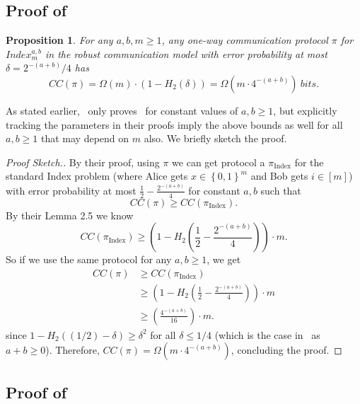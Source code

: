 \documentclass[11pt]{article}
\newtheorem*{proposition*}{Proposition}
\theoremstyle{definition}
\renewcommand{\leq}{\leqslant}
\renewcommand{\geq}{\geqslant}
\newcommand{\paren}[1]{\ensuremath{\left(#1\right)}\xspace}
\newcommand{\set}[1]{\ensuremath{\left\{ #1 \right\}}}
\newcommand{\prot}{\ensuremath{\pi}}
\begin{document}
\subsection{Proof of~}\label{sec:prop:robust-index}

\begin{proposition*}%
	For any $a,b,m \geq 1$, any one-way communication protocol $\prot$ for $Index^{a,b}_m$ in the robust communication model with error probability at most $\delta = 2^{-(a+b)}/4$ has
	\[
		CC(\pi) = \Omega(m) \cdot (1-H_2(\delta)) = \Omega(m \cdot 4^{-(a+b)})~bits. 
	\]
\end{proposition*}

As stated earlier,~\cite[Theorem 5.3]{ChakrabartiCM08} only proves~ for constant values of $a,b \geq 1$, but explicitly tracking the parameters in their proofs imply the above bounds as well for 
all $a,b \geq 1$ that may depend on $m$ also. We briefly sketch the proof. 

\begin{proof}[Proof Sketch.]
By their proof, using $\pi$ we can get protocol a $\pi_{\text{Index}}$ for the standard Index problem (where Alice gets $x \in \set{0,1}^m$ and Bob gets $i \in [m]$) with error probability at most $\frac12 - \frac{2^{-(a+b)}}{4}$ for constant $a, b$ such that
\[
CC(\pi) \geq CC( \pi_\text{Index}).
\]
By their Lemma 2.5 we know 
\[
CC(\pi_{\text{Index}}) \geq (1-H_2\paren{\frac12 - \frac{2^{-(a+b)}}{4}})\cdot m.
\]
So if we use the same protocol for any $a, b\geq 1$, we get
\begin{align*}
	CC(\pi) 
	&\geq CC( \pi_\text{Index})
	\\
	&\geq (1-H_2\paren{\frac12 - \frac{2^{-(a+b)}}{4}})\cdot m
	\\
	&\geq (\frac{4^{-(a+b)}}{16}) \cdot m.
\end{align*}
since $1-H_2((1/2)-\delta) \geq \delta^2$ for all $\delta \leq 1/4$ (which is the case in~ as $a+b \geq 0$). Therefore, $CC(\pi)=\Omega(m \cdot 4^{-(a+b)})$, 
concluding the proof. 
\end{proof}

\subsection{Proof of~}\label{sec:lem:set-limited-size}
\end{document}
